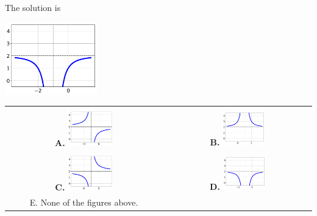 \documentclass{article}[14pt]
\begin{document}
 
 The solution is  
 \begin{center} \includegraphics[width=0.3\textwidth]{../Figures/rationalEquationToGraphCD.png} \end{center}\begin{tabular}{|c|c|} 
\hline 
 & \tabularnewline 
 \textbf{A.} \includegraphics[width=0.3\textwidth]{../Figures/rationalEquationToGraphCA.png} & \textbf{B.} \includegraphics[width=0.3\textwidth]{../Figures/rationalEquationToGraphCB.png} \tabularnewline 
\hline 
 & \tabularnewline 
 \textbf{C.} \includegraphics[width=0.3\textwidth]{../Figures/rationalEquationToGraphCC.png} & \textbf{D.} \includegraphics[width=0.3\textwidth]{../Figures/rationalEquationToGraphCD.png} \tabularnewline 
\hline 
 E. None of the figures above. & \tabularnewline 
\hline 
 \end{tabular} 
 
\end{document}
